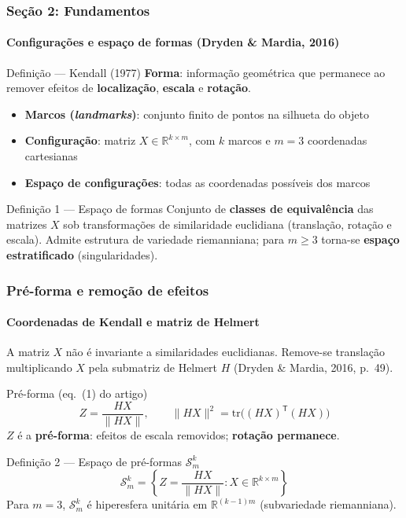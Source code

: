 \documentclass[brazilian,11pt]{beamer}
\begin{document}
\begin{frame}[shrink=8]
    \frametitle{Seção 2: Fundamentos}
    \framesubtitle{Configurações e espaço de formas (Dryden \& Mardia, 2016)}

    \begin{block}{Definição --- Kendall (1977)}
        \textbf{Forma}: informação geométrica que permanece ao remover efeitos de \textbf{localização}, \textbf{escala} e \textbf{rotação}.
    \end{block}

    \begin{itemize}
        \item \textbf{Marcos (\textit{landmarks})}: conjunto finito de pontos na silhueta do objeto
        \item \textbf{Configuração}: matriz $X \in \mathbb{R}^{k \times m}$, com $k$ marcos e $m=3$ coordenadas cartesianas
        \item \textbf{Espaço de configurações}: todas as coordenadas possíveis dos marcos
    \end{itemize}

    \begin{block}{Definição 1 --- Espaço de formas}
        Conjunto de \textbf{classes de equivalência} das matrizes $X$ sob transformações de similaridade euclidiana (translação, rotação e escala). Admite estrutura de variedade riemanniana; para $m \geq 3$ torna-se \textbf{espaço estratificado} (singularidades).
    \end{block}
\end{frame}

\begin{frame}[shrink=10]
    \frametitle{Pré-forma e remoção de efeitos}
    \framesubtitle{Coordenadas de Kendall e matriz de Helmert}

    \small
    A matriz $X$ não é invariante a similaridades euclidianas. Remove-se translação multiplicando $X$ pela submatriz de Helmert $H$ (Dryden \& Mardia, 2016, p.~49).

    \begin{block}{Pré-forma (eq.~(1) do artigo)}
        \begin{equation}
            Z = \frac{HX}{\|HX\|}, \qquad
            \|HX\|^2 = \mathrm{tr}\bigl((HX)^{\mathsf T}(HX)\bigr)
        \end{equation}
        $Z$ é a \textbf{pré-forma}: efeitos de escala removidos; \textbf{rotação permanece}.
    \end{block}

    \begin{block}{Definição 2 --- Espaço de pré-formas $\mathcal{S}_m^k$}
        \[
            \mathcal{S}_m^k = \left\{ Z = \frac{HX}{\|HX\|} : X \in \mathbb{R}^{k \times m} \right\}
        \]
        Para $m=3$, $\mathcal{S}_m^k$ é hiperesfera unitária em $\mathbb{R}^{(k-1)m}$ (subvariedade riemanniana).
    \end{block}
\end{frame}
\end{document}
